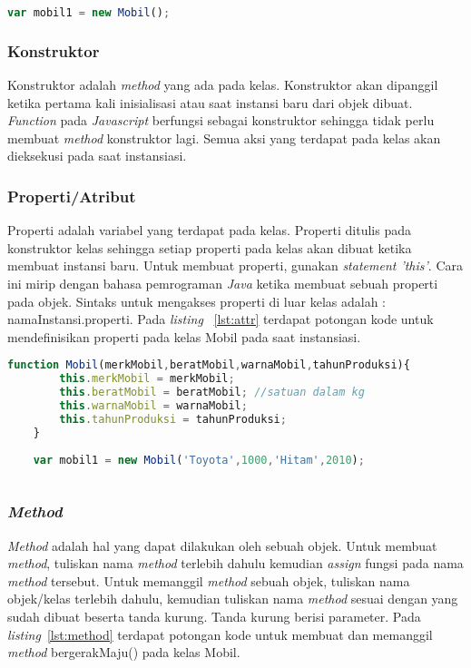 \begin{lstlisting}[language=Javascript, caption=Membuat instansi mobil, label={lst:object}]
	var mobil1 = new Mobil();
\end{lstlisting}

\subsubsection{Konstruktor}
Konstruktor adalah \textit{method} yang ada pada kelas. Konstruktor akan dipanggil ketika pertama kali inisialisasi atau saat instansi baru dari objek dibuat. \textit{Function} pada \textit{Javascript} berfungsi sebagai konstruktor sehingga tidak perlu membuat \textit{method} konstruktor lagi. Semua aksi yang terdapat pada kelas akan dieksekusi pada saat instansiasi.

\subsubsection{Properti/Atribut}
Properti adalah variabel yang terdapat pada kelas. Properti ditulis pada konstruktor kelas sehingga setiap properti pada kelas akan dibuat ketika membuat instansi baru. Untuk membuat properti, gunakan \textit{statement 'this'}. Cara ini mirip dengan bahasa pemrograman \textit{Java} ketika membuat sebuah properti pada objek. Sintaks untuk mengakses properti di luar kelas adalah : namaInstansi.properti. Pada \textit{listing} ~\ref{lst:attr} terdapat potongan kode untuk mendefinisikan properti pada kelas Mobil pada saat instansiasi.

\begin{lstlisting}[language=Javascript, caption=Mendefinisikan properti kelas Mobil pada konstruktor, label={lst:attr}]
	function Mobil(merkMobil,beratMobil,warnaMobil,tahunProduksi){
		this.merkMobil = merkMobil;
		this.beratMobil = beratMobil; //satuan dalam kg
		this.warnaMobil = warnaMobil;
		this.tahunProduksi = tahunProduksi;
	}
	
	var mobil1 = new Mobil('Toyota',1000,'Hitam',2010);
	
\end{lstlisting}

\subsubsection{\textit{Method}}
\textit{Method} adalah hal yang dapat dilakukan oleh sebuah objek. Untuk membuat \textit{method}, tuliskan nama \textit{method} terlebih dahulu kemudian \textit{assign} fungsi pada nama \textit{method} tersebut. Untuk memanggil \textit{method} sebuah objek, tuliskan nama objek/kelas terlebih dahulu, kemudian tuliskan nama \textit{method} sesuai dengan yang sudah dibuat beserta tanda kurung. Tanda kurung berisi parameter. Pada \textit{listing}~\ref{lst:method} terdapat potongan kode untuk membuat dan memanggil \textit{method} bergerakMaju() pada kelas Mobil.

